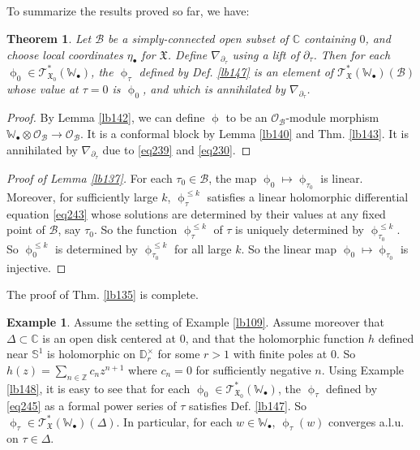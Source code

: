 \documentclass[12pt,a4paper,notitlepage]{article}
\theoremstyle{definition}
\newtheorem{eg}[df]{Example}
\theoremstyle{plain}
\newtheorem{thm}[df]{Theorem}
\newcommand{\fk}{\mathfrak}
\newcommand{\mc}{\mathcal}
\newcommand{\scr}{\mathscr}
\newcommand{\blt}{\bullet}
\newcommand{\Wbb}{\mathbb W}
\newcommand{\Cbb}{\mathbb C}
\newcommand{\Zbb}{\mathbb Z}
\newcommand{\Dbb}{\mathbb D}
\newcommand{\Sbb}{{\mathbb S}}
\numberwithin{equation}{section}
\begin{document}
\subsection{}

To summarize the results proved so far, we have:
\begin{thm}\label{lb145}
Let $\mc B$ be a simply-connected open subset of $\Cbb$ containing $0$, and choose local coordinates $\eta_\blt$ for $\fk X$. Define $\nabla_{\partial_\tau}$ using a lift of $\partial_\tau$. Then for each $\upphi_0\in\scr T_{\fk X_0}^*(\Wbb_\blt)$, the $\upphi_\tau$ defined by Def. \ref{lb147} is an element of $\scr T^*_{\fk X}(\Wbb_\blt)(\mc B)$ whose value at $\tau=0$ is $\upphi_0$, and which is annihilated by $\nabla_{\partial_\tau}$.
\end{thm}

\begin{proof}
By Lemma \ref{lb142}, we can define $\upphi$ to be an $\scr O_{\mc B}$-module morphism $\Wbb_\blt\otimes\scr O_{\mc B}\rightarrow\scr O_{\mc B}$. It is a conformal block by Lemma \ref{lb140} and Thm. \ref{lb143}. It is annihilated by $\nabla_{\partial_\tau}$ due to \eqref{eq239} and \eqref{eq230}.
\end{proof}



\begin{proof}[Proof of Lemma \ref{lb137}]
For each $\tau_0\in\mc B$, the map $\upphi_0\mapsto\upphi_{\tau_0}$ is linear. Moreover, for sufficiently large $k$, $\upphi_\tau^{\leq k}$ satisfies a linear holomorphic differential equation \eqref{eq243} whose solutions are determined by their values at any fixed point of $\mc B$, say $\tau_0$. So the function $\upphi^{\leq k}_\tau$ of $\tau$ is uniquely determined by $\upphi^{\leq k}_{\tau_0}$. So $\upphi_0^{\leq k}$ is determined by $\upphi_{\tau_0}^{\leq k}$ for all large $k$. So the linear map $\upphi_0\mapsto\upphi_{\tau_0}$ is injective.
\end{proof}


The proof of Thm. \ref{lb135} is complete.


\begin{eg}\label{lb149}
Assume the setting of Example \ref{lb109}. Assume moreover that $\Delta\subset\Cbb$ is an open  disk centered at $0$, and that  the holomorphic function $h$ defined near $\Sbb^1$ is holomorphic on $\Dbb_r^\times$ for some $r>1$ with finite poles at $0$. So $h(z)=\sum_{n\in\Zbb}c_nz^{n+1}$ where $c_n=0$ for sufficiently negative $n$. Using Example \ref{lb148}, it is easy to see that for each $\upphi_0\in\scr T_{\fk X_0}^*(\Wbb_\blt)$, the $\upphi_\tau$ defined by \eqref{eq245} as a formal power series of $\tau$ satisfies Def. \ref{lb147}. So $\upphi_\tau\in\scr T_{\fk X}^*(\Wbb_\blt)(\Delta)$. In particular, for each $w\in\Wbb_\blt$, $\upphi_\tau(w)$ converges a.l.u. on $\tau\in\Delta$.
\end{eg}
\end{document}
